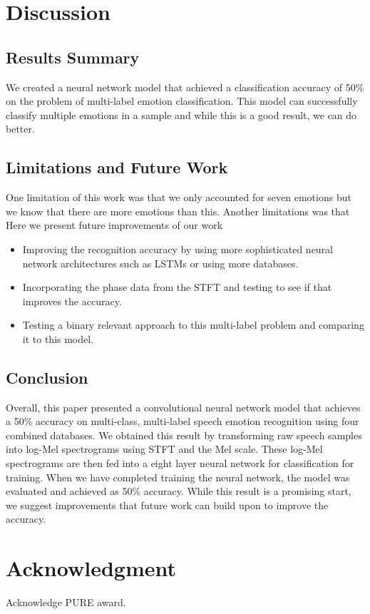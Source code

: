 \documentclass[conference]{IEEEtran}
\begin{document}
\section{Discussion}

\subsection{Results Summary}

We created a neural network model that achieved a classification accuracy of 50\% on the problem of multi-label emotion classification. This model can successfully classify multiple emotions in a sample and while this is a good result, we can do better.

\subsection{Limitations and Future Work}

One limitation of this work was that we only accounted for seven emotions but we know that there are more emotions than this. \cite{} Another limitations was that 
Here we present future improvements of our work 
\begin{itemize}
	\item Improving the recognition accuracy by using more sophisticated neural network architectures such as LSTMs or using more databases.
	\item Incorporating the phase data from the STFT and testing to see if that improves the accuracy.
	\item Testing a binary relevant approach to this multi-label problem and comparing it to this model.
\end{itemize}

\subsection{Conclusion}

Overall, this paper presented a convolutional neural network model that achieves a 50\% accuracy on multi-class, multi-label speech emotion recognition using four combined databases. We obtained this result by transforming raw speech samples into log-Mel spectrograms using STFT and the Mel scale. These log-Mel spectrograms are then fed into a eight layer neural network for classification for training. When we have completed training the neural network, the model was evaluated and achieved as 50\% accuracy. While this result is a promising start, we suggest improvements that future work can build upon to improve the accuracy.

\section*{Acknowledgment}
Acknowledge PURE award.




\end{document}
